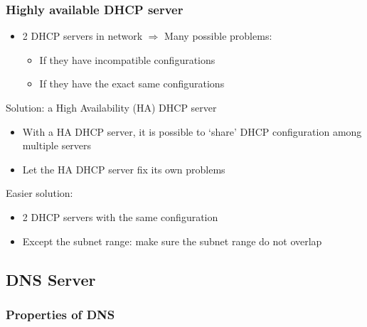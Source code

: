 \documentclass{article}
\begin{document}
\subsubsection{Highly available DHCP server}

\begin{itemize}
    \item 2 DHCP servers in network $\Rightarrow$ Many possible problems:
    \begin{itemize}
        \item If they have incompatible configurations
        \item If they have the exact same configurations
    \end{itemize}
\end{itemize}

Solution: a High Availability (HA) DHCP server

\begin{itemize}
    \item With a HA DHCP server, it is possible to `share' DHCP configuration among multiple servers
    \item Let the HA DHCP server fix its own problems 
\end{itemize}

Easier solution:

\begin{itemize}
    \item 2 DHCP servers with the same configuration
    \item Except the subnet range: make sure the subnet range do not overlap
\end{itemize}

\subsection{DNS Server}

\subsubsection{Properties of DNS}
\end{document}
